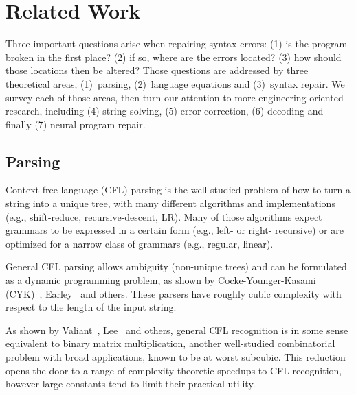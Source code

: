 \documentclass[sigplan,review,acmsmall,nonacm,anonymous]{acmart}\settopmatter{printfolios=false,printccs=false,printacmref=false}
\begin{document}

  \clearpage\section{Related Work}\label{sec:related}

  Three important questions arise when repairing syntax errors: (1) is the program broken in the first place? (2) if so, where are the errors located? (3) how should those locations then be altered? Those questions are addressed by three theoretical areas, (1)~parsing, (2)~language equations and (3)~syntax repair. We survey each of those areas, then turn our attention to more engineering-oriented research, including (4) string solving, (5) error-correction, (6) decoding and finally (7) neural program repair.

  \subsection{Parsing}

  Context-free language (CFL) parsing is the well-studied problem of how to turn a string into a unique tree, with many different algorithms and implementations (e.g., shift-reduce, recursive-descent, LR). Many of those algorithms expect grammars to be expressed in a certain form (e.g., left- or right- recursive) or are optimized for a narrow class of grammars (e.g., regular, linear).

  General CFL parsing allows ambiguity (non-unique trees) and can be formulated as a dynamic programming problem, as shown by Cocke-Younger-Kasami (CYK)~\cite{sakai1961syntax}, Earley~\cite{earley1970efficient} and others. These parsers have roughly cubic complexity with respect to the length of the input string.

  As shown by Valiant~\cite{valiant1975general}, Lee~\cite{lee2002fast} and others, general CFL recognition is in some sense equivalent to binary matrix multiplication, another well-studied combinatorial problem with broad applications, known to be at worst subcubic. This reduction opens the door to a range of complexity-theoretic speedups to CFL recognition, however large constants tend to limit their practical utility.
\end{document}
